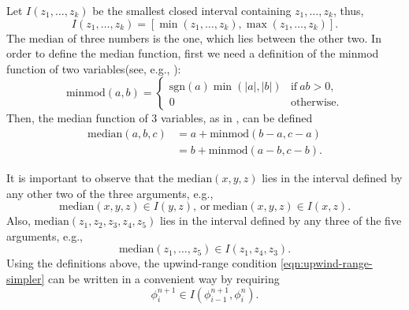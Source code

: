 \documentclass[../thesis.tex]{subfiles}
\begin{document}
Let \(I(z_{1}, \dots, z_{k})\) be the smallest closed interval containing \(z_{1}, \dots, z_{k}\),
thus,
\begin{equation}
    I(z_{1}, \dots, z_{k})
    = \left[\min(z_{1}, \dots, z_{k}),
    \max(z_{1}, \dots, z_{k})\right].
\end{equation}
The \(\mbox{median}\) of three numbers is the one, which lies between the other two.
In order to define the median function, first we need a definition of the minmod function of two variables(see, e.g., \cite{1993_Huynh}):
\begin{equation}
    \mbox{minmod}(a,b) =
    \begin{cases}
        \mbox{sgn}(a) \min(|a|,|b|) & \text{if}\ ab > 0, \\
        0 & \text{otherwise}.
    \end{cases}
\end{equation}
Then, the median function of 3 variables, as in \cite{1989_Huynh_CONF,1993_Huynh}, can be defined
\begin{equation}
    \begin{split}
        \mbox{median}(a,b,c)
        &= a + \mbox{minmod}\left( b - a, c - a \right)
        \\
        &= b + \mbox{minmod}\left( a - b, c - b \right).
    \end{split}
\end{equation}

It is important to observe that the \(\mbox{median}(x,y,z)\) lies in the interval defined by any other two of the three arguments, e.g.,
\begin{equation}
    \mbox{median}(x,y,z) \in I(y,z),\ \text{or}\
    \mbox{median}(x,y,z) \in I(x,z).
\end{equation}
Also, \(\mbox{median}(z_{1}, z_{2},z_{3}, z_{4},z_{5})\) lies in the interval defined by any three of the five arguments, e.g.,
\begin{equation}
    \mbox{median}(z_{1},\dots,z_{5}) \in I(z_{1},z_{4}, z_{3}).
\end{equation}
Using the definitions above, the upwind-range condition \eqref{eqn:upwind-range-simpler} can be written in a convenient way by requiring
\begin{equation}
    \phi_{i}^{n+1}\in I(\phi_{i-1}^{n+1}, \phi_{i}^{n}).
\end{equation}
\end{document}
